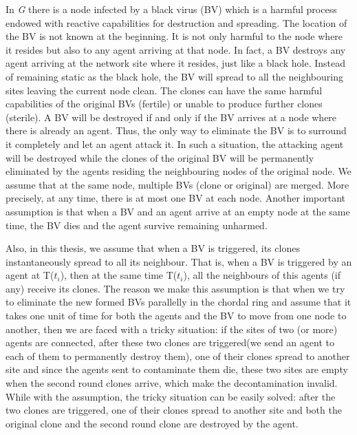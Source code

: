 In {\em G} there is a node infected by a black virus (BV) which is a harmful process endowed with reactive capabilities for destruction and spreading. The location of the BV is not known at the beginning. It is not only harmful to the node where it resides but also to any agent arriving at that node. In fact, a BV destroys any agent arriving at the network site where it resides, just like a black hole. Instead of remaining static as the black hole, the BV will spread to all the neighbouring sites leaving the current node clean. The clones can have the same harmful capabilities of the original BVs (fertile) or unable to produce further clones (sterile). A BV will be destroyed if and only if the BV arrives at a node where there is already an agent. Thus, the only way to eliminate the BV is to surround it completely and let an agent attack it. In such a situation, the attacking agent will be destroyed while the clones of the original BV will be permanently eliminated by the agents residing the neighbouring nodes of the original node. We assume that at the same node, multiple BVs (clone or original) are merged. More precisely, at any time, there is at most one BV at each node. 
Another important assumption is that when a BV and an agent arrive at an empty node at the same time, the BV dies and the agent survive remaining unharmed.

Also, in this thesis, we assume that when a BV is triggered,  its clones instantaneously spread to all its neighbour.   That is, when a BV is triggered by an agent at T($t_i$), then at the same time  T($t_i$), all the neighbours of this agents (if any) receive its clones. The reason we make this assumption is that when we try to eliminate the new formed BVs parallelly in the chordal ring and assume that it takes one unit of time for both the agents and the BV to move from one node to another, then we are faced with a tricky situation: if the sites of two (or more) agents are connected, after these two clones are triggered(we send an agent to each of them to permanently destroy them), one of their clones spread to another site and since the agents sent to contaminate them die, these two sites are empty when the second round clones arrive, which make the decontamination invalid.
While with the assumption, the tricky situation can be easily solved: after the two clones are triggered, one of their clones spread to another site and both the original clone and the second round clone are destroyed by the agent.



